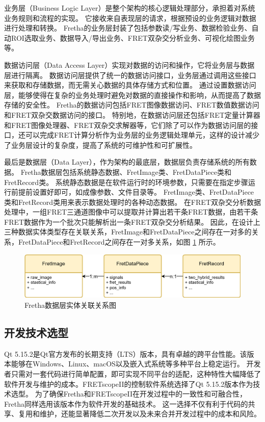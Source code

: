 业务层（Business Logic Layer）是整个架构的核心逻辑处理部分，承担着对系统业务规则和流程的实现。
它接收来自表现层的请求，根据预设的业务逻辑对数据进行处理和转换。
Fretha的业务层封装了包括参数读/写业务、数据检验业务、自动ROI选取业务、数据导入/导出业务、FRET双杂交分析业务、可视化绘图业务等。

数据访问层（Data Access Layer）实现对数据的访问和操作，它将业务层与数据层进行隔离。
数据访问层提供了统一的数据访问接口，业务层通过调用这些接口来获取和存储数据，而无需关心数据的具体存储方式和位置。
通过设置数据访问层，能够使得在复杂的业务处理时避免对数据的直接操作和影响，从而提高了数据存储的安全性。
Fretha的数据访问包括FRET图像数据访问、FRET数值数据访问和FRET双杂交数据访问的接口。
特别地，在数据访问层还包括FRET定量计算器和FRET图像处理器、FRET双杂交求解器等，它们除了可以作为数据访问层的接口，还可以完成FRET计算分析作为业务层的业务逻辑处理单元，这样的设计减少了业务层设计的复杂度，提高了系统的可维护性和可扩展性。

最后是数据层（Data Layer），作为架构的最底层，数据层负责存储系统的所有数据。
Fretha数据层包括系统静态数据、FretImage类、FretDataPiece类和FretRecord类。
系统静态数据是在软件运行时的环境参数，只需要在指定步骤运行前提前设置好即可，如成像参数、文件目录等。
FretImage类、FretDataPiece类和FretRecord类用来表示数据处理时的各种动态数据。
在FRET双杂交分析数据处理中，一组FRET三通道图像中可以提取并计算出若干条FRET数据，由若干条FRET数据作为一个批次只能解析出一条FRET双杂交分析结果。
因此，在设计上三种数据实体类型存在关联关系，FretImage和FretDataPiece之间存在一对多的关系，FretDataPiece和FretRecord之间存在一对多关系，如图 \ref{fig:fretha_data_relations} 所示。
\begin{figure}[hbtp]
    \centering
    \includegraphics[width=1\linewidth]{../figures/2/2_Fretha数据层对应关系.png}
    \caption{Fretha数据层实体关联关系图}
    \label{fig:fretha_data_relations}
\end{figure}

\subsection{开发技术选型}
\ifshowtext
Qt 5.15.2是Qt官方发布的长期支持（LTS）版本，具有卓越的跨平台性能。该版本能够在Windows、Linux、macOS以及嵌入式系统等多种平台上稳定运行。
开发者只需对一套代码进行简单配置，即可实现不同平台的适配，这种特性大幅降低了软件开发与维护的成本。FRETscopeII的控制软件系统选择了Qt 5.15.2版本作为技术选型。
为了确保Fretha和FRETscopeII在开发过程中的一致性和可融合性，Fretha同样选用该版本作为软件开发的基础技术。
这一选择不仅有利于代码的共享、复用和维护，还能显著降低二次开发以及未来合并开发过程中的成本和风险。


